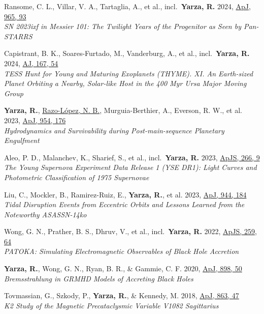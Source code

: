 \item Ransome, C. L., Villar, V. A., Tartaglia, A., et al., incl.\ \textbf{Yarza, R.} 2024, \href{https://ui.adsabs.harvard.edu/abs/2024ApJ...965...93R}{ApJ, 965, 93}\\\textit{SN 2023ixf in Messier 101: The Twilight Years of the Progenitor as Seen by Pan-STARRS}

\item Capistrant, B. K., Soares-Furtado, M., Vanderburg, A., et al., incl.\ \textbf{Yarza, R.} 2024, \href{https://ui.adsabs.harvard.edu/abs/2024AJ....167...54C}{AJ, 167, 54}\\\textit{TESS Hunt for Young and Maturing Exoplanets (THYME). XI. An Earth-sized Planet Orbiting a Nearby, Solar-like Host in the 400 Myr Ursa Major Moving Group}

\item \textbf{Yarza, R.}, \underline{Razo-López, N. B.}, Murguia-Berthier, A., Everson, R. W., et al. 2023, \href{https://ui.adsabs.harvard.edu/abs/2023ApJ...954..176Y}{ApJ, 954, 176}\\\textit{Hydrodynamics and Survivability during Post-main-sequence Planetary Engulfment}

\item Aleo, P. D., Malanchev, K., Sharief, S., et al., incl.\ \textbf{Yarza, R.} 2023, \href{https://ui.adsabs.harvard.edu/abs/2023ApJS..266....9A}{ApJS, 266, 9}\\\textit{The Young Supernova Experiment Data Release 1 (YSE DR1): Light Curves and Photometric Classification of 1975 Supernovae}

\item Liu, C., Mockler, B., Ramirez-Ruiz, E., \textbf{Yarza, R.}, et al. 2023, \href{https://ui.adsabs.harvard.edu/abs/2023ApJ...944..184L}{ApJ, 944, 184}\\\textit{Tidal Disruption Events from Eccentric Orbits and Lessons Learned from the Noteworthy ASASSN-14ko}

\item Wong, G. N., Prather, B. S., Dhruv, V., et al., incl.\ \textbf{Yarza, R.} 2022, \href{https://ui.adsabs.harvard.edu/abs/2022ApJS..259...64W}{ApJS, 259, 64}\\\textit{PATOKA\@: Simulating Electromagnetic Observables of Black Hole Accretion}

\item \textbf{Yarza, R.}, Wong, G. N., Ryan, B. R., \& Gammie, C. F. 2020, \href{https://ui.adsabs.harvard.edu/abs/2020ApJ...898...50Y}{ApJ, 898, 50}\\\textit{Bremsstrahlung in GRMHD Models of Accreting Black Holes}

\item Tovmassian, G., Szkody, P., \textbf{Yarza, R.}, \& Kennedy, M. 2018, \href{https://ui.adsabs.harvard.edu/abs/2018ApJ...863...47T}{ApJ, 863, 47}\\\textit{K2 Study of the Magnetic Precataclysmic Variable V1082 Sagittarius}

